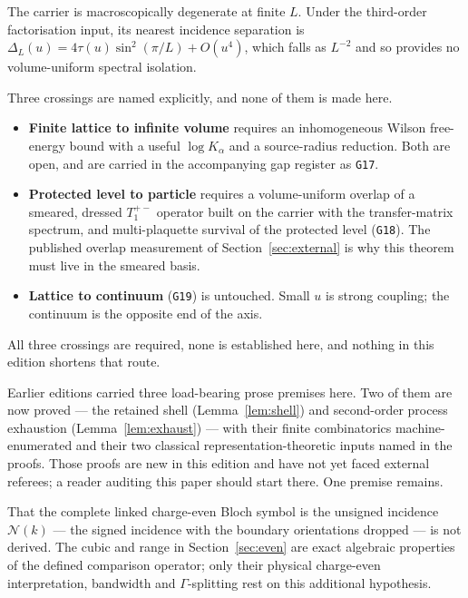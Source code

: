 \documentclass[11pt]{article}
\theoremstyle{plain}
\theoremstyle{definition}
\theoremstyle{remark}
\newcommand{\chk}[1]{}
\begin{document}
The carrier is macroscopically degenerate at finite $L$. Under the
third-order factorisation input, its nearest incidence separation is
$\Delta_L(u)=4\tau(u)\sin^2(\pi/L)+O(u^4)$, which falls as $L^{-2}$ and so
provides no volume-uniform spectral isolation.
\chk{Delta\_L = 4 tau(u) sin\^{}2(pi/L) is positive and falls as L\^{}-2}

Three crossings are named explicitly, and none of them is made here.

\begin{itemize}\itemsep2pt
\item \textbf{Finite lattice to infinite volume} requires an inhomogeneous
  Wilson free-energy bound with a useful $\log K_\alpha$ and a source-radius
  reduction. Both are open, and are carried in the accompanying gap register as
  \texttt{G17}.
\item \textbf{Protected level to particle} requires a volume-uniform overlap
  of a smeared, dressed $T_1^{+-}$ operator built on the carrier with the
  transfer-matrix spectrum, and multi-plaquette survival of the protected
  level (\texttt{G18}). The published overlap measurement of
  Section~\ref{sec:external} is why this theorem must live in the smeared
  basis.
\item \textbf{Lattice to continuum} (\texttt{G19}) is untouched. Small $u$ is
  strong coupling; the continuum is the opposite end of the axis.
\end{itemize}

\noindent All three crossings are required, none is established here, and
nothing in this edition shortens that route.

Earlier editions carried three load-bearing prose premises here. Two of them
are now proved --- the retained shell (Lemma~\ref{lem:shell}) and
second-order process exhaustion (Lemma~\ref{lem:exhaust}) --- with their
finite combinatorics machine-enumerated and their two classical
representation-theoretic inputs named in the proofs. Those proofs are new in
this edition and have not yet faced external referees; a reader auditing
this paper should start there. One premise remains.

That the complete linked charge-even Bloch symbol is the unsigned incidence
$\mathcal N(k)$ --- the signed incidence with the boundary orientations
dropped --- is not derived. The cubic and range in Section~\ref{sec:even} are
exact algebraic properties of the defined comparison operator; only their
physical charge-even interpretation, bandwidth and $\Gamma$-splitting rest on
this additional hypothesis.
\end{document}
